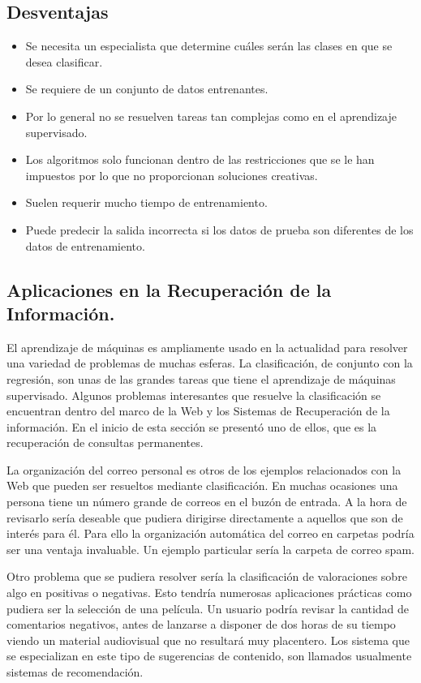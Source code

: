 \documentclass{llncs}
\begin{document}
	\subsection{Desventajas}
				\begin{itemize}
					\item Se necesita un especialista que determine cu\'ales ser\'an las clases en que se desea clasificar.
					\item Se requiere de un conjunto de datos entrenantes.
					\item Por lo general no se resuelven tareas tan complejas como en el aprendizaje supervisado.
					\item Los algoritmos solo funcionan dentro de las restricciones que se le han impuestos por lo que no proporcionan soluciones creativas.
					\item Suelen requerir mucho tiempo de entrenamiento.
					\item Puede predecir la salida incorrecta si los datos de prueba son diferentes de los datos de entrenamiento.
				\end{itemize}
				
	\subsection{Aplicaciones en la Recuperaci\'on de la Informaci\'on.} \label{App_RI}
		
		El aprendizaje de m\'aquinas es ampliamente usado en la actualidad para resolver una variedad de problemas de muchas esferas. La clasificaci\'on, de conjunto con la regresi\'on, son unas de las grandes tareas que tiene el aprendizaje de m\'aquinas supervisado. Algunos problemas interesantes que resuelve la clasificaci\'on se encuentran dentro del marco de la Web y los Sistemas de Recuperaci\'on de la informaci\'on. En el inicio de esta secci\'on se present\'o uno de ellos, que es la recuperaci\'on de consultas permanentes.
		
		La organizaci\'on del correo personal es otros de los ejemplos relacionados con la Web que pueden ser resueltos mediante clasificaci\'on. En muchas ocasiones una persona tiene un n\'umero grande de correos en el buz\'on de entrada. A la hora de revisarlo ser\'ia deseable que pudiera dirigirse directamente a aquellos que son de inter\'es para \'el. Para ello la organizaci\'on autom\'atica del correo en carpetas podr\'ia ser una ventaja invaluable. Un ejemplo particular ser\'ia la carpeta de correo spam.
		
		Otro problema que se pudiera resolver ser\'ia la clasificaci\'on de valoraciones sobre algo en positivas o negativas. Esto tendr\'ia numerosas aplicaciones pr\'acticas como pudiera ser la selecci\'on de una pel\'icula. Un usuario podr\'ia revisar la cantidad de comentarios negativos, antes de lanzarse a disponer de dos horas de su tiempo viendo un material audiovisual que no resultar\'a muy placentero. Los sistema que se especializan en este tipo de sugerencias de contenido, son llamados usualmente sistemas de recomendaci\'on.
		
\end{document}
